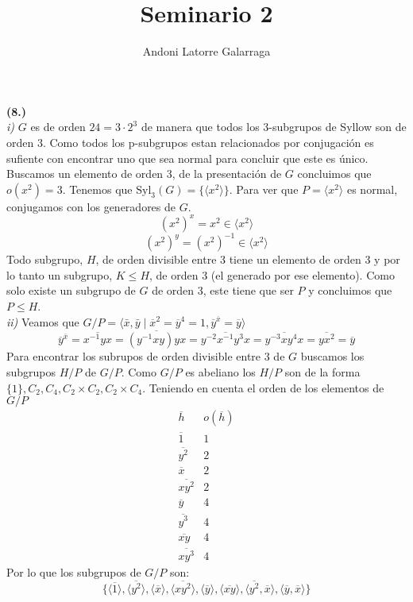 \documentclass{article}
\title{Seminario 2}
\author{Andoni Latorre Galarraga}
\date{}
\begin{document}
\maketitle

\textbf{(8.)}\\
\textit{i)} $G$ es de orden $24=3\cdot2^3$ de manera que todos los 3-subgrupos de Syllow son de orden 3. Como todos los p-subgrupos estan relacionados por conjugación es sufiente con encontrar uno que sea normal para concluir que este es único. Buscamos un elemento de orden 3, de la presentación de $G$ concluimos que $o(x^2)=3$. Tenemos que $\text{Syl}_3(G)= \{ \langle x^2 \rangle \}$. Para ver que $P = \langle x^2 \rangle$ es normal, conjugamos con los generadores de $G$.
$$
(x^2)^x=x^2\in \langle x^2 \rangle
$$
$$
(x^2)^y=(x^2)^{-1} \in \langle x^2 \rangle
$$
Todo subgrupo, $H$, de orden divisible entre 3 tiene un elemento de orden 3 y por lo tanto un subgrupo, $K\leq H$, de orden 3 (el generado por ese elemento). Como solo existe un subgrupo de $G$ de orden 3, este tiene que ser $P$ y concluimos que $P\leq H$.\\
\textit{ii)} Veamos que $G/P = \langle \bar{x}, \bar{y} \mid \overline{x}^2=\overline{y}^4=1,\overline{y}^{\overline{x}}=\overline{y} \rangle$
$$
\overline{y}^{\overline{x}} = \overline{x^{-1}yx} = \overline{(y^{-1}xy)yx} = \overline{y^{-2}x^{-1}y^3x} = \overline{y^{-3}xy^4x} = \overline{yx^2} = \overline{y}
$$
Para encontrar los subrupos de orden divisible entre 3 de $G$ buscamos los subgrupos $H/P$ de $G/P$. Como $G/P$ es abeliano los $H/P$ son de la forma $\{1\},C_2,C_4,C_2\times C_2, C_2\times C_4$. Teniendo en cuenta el orden de los elementos de $G/P$
$$
\begin{array}{c|c}
    \overline{h} & o(\overline{h}) \\ \hline
    \overline{1} & 1 \\
    \overline{y^2} & 2 \\
    \overline{x} & 2 \\
    \overline{xy^2} & 2 \\
    \overline{y} & 4 \\
    \overline{y^3} & 4 \\
    \overline{xy} & 4 \\
    \overline{xy^3} & 4
\end{array}
$$
Por lo que los subgrupos de $G/P$ son:
$$
\{
\langle \overline{1} \rangle,
\langle \overline{y^2} \rangle,
\langle \overline{x} \rangle,
\langle \overline{xy^2} \rangle,
\langle \overline{y} \rangle,
\langle \overline{xy} \rangle,
\langle \overline{y^2}, \overline{x} \rangle,
\langle \overline{y}, \overline{x}  \rangle
\}
$$
\end{document}
